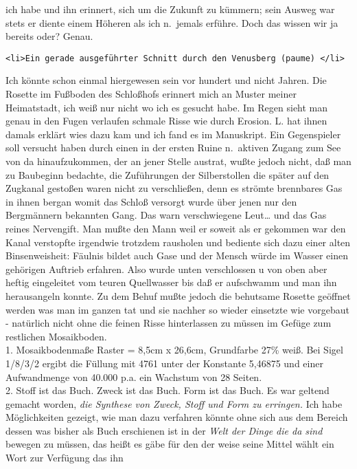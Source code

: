 \documentclass[
]{article}
\begin{document}
ich habe und ihn erinnert, sich um die Zukunft zu kümmern; sein Ausweg
war stets er diente einem Höheren als ich n.~jemals erführe. Doch das
wissen wir ja bereits oder? Genau.

\begin{verbatim}
<li>Ein gerade ausgeführter Schnitt durch den Venusberg (paume) </li>
\end{verbatim}

Ich könnte schon einmal hiergewesen sein vor hundert und nicht Jahren.
Die Rosette im Fußboden des Schloßhofs erinnert mich an Muster meiner
Heimatstadt, ich weiß nur nicht wo ich es gesucht habe. Im Regen sieht
man genau in den Fugen verlaufen schmale Risse wie durch Erosion. L. hat
ihnen damals erklärt wies dazu kam und ich fand es im Manuskript. Ein
Gegenspieler soll versucht haben durch einen in der ersten Ruine
n.~aktiven Zugang zum See von da hinaufzukommen, der an jener Stelle
austrat, wußte jedoch nicht, daß man zu Baubeginn bedachte, die
Zuführungen der Silberstollen die später auf den Zugkanal gestoßen waren
nicht zu verschließen, denn es strömte brennbares Gas in ihnen bergan
womit das Schloß versorgt wurde über jenen nur den Bergmännern bekannten
Gang. Das warn verschwiegene Leut\ldots{} und das Gas reines Nervengift.
Man mußte den Mann weil er soweit als er gekommen war den Kanal
verstopfte irgendwie trotzdem rausholen und bediente sich dazu einer
alten Binsenweisheit: Fäulnis bildet auch Gase und der Mensch würde im
Wasser einen gehörigen Auftrieb erfahren. Also wurde unten verschlossen
u von oben aber heftig eingeleitet vom teuren Quellwasser bis daß er
aufschwamm und man ihn herausangeln konnte. Zu dem Behuf mußte jedoch
die behutsame Rosette geöffnet werden was man im ganzen tat und sie
nachher so wieder einsetzte wie vorgebaut - natürlich nicht ohne die
feinen Risse hinterlassen zu müssen im Gefüge zum restlichen
Mosaikboden.\\
1. Mosaikbodenmaße Raster = 8,5cm x 26,6cm, Grundfarbe 27\% weiß. Bei
Sigel 1/8/3/2 ergibt die Füllung mit 4761 unter der Konstante 5,46875
und einer Aufwandmenge von 40.000 p.a. ein Wachstum von 28 Seiten.\\
2. Stoff ist das Buch. Zweck ist das Buch. Form ist das Buch. Es war
geltend gemacht worden, \emph{die Synthese von Zweck, Stoff und Form zu
erringen. }Ich habe Möglichkeiten gezeigt, wie man dazu verfahren könnte
ohne sich aus dem Bereich dessen was bisher als Buch erschienen ist in
der \emph{Welt der Dinge die da sind} bewegen zu müssen, das heißt es
gäbe für den der weise seine Mittel wählt ein Wort zur Verfügung das ihn
\end{document}

